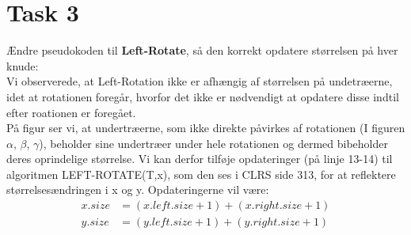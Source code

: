 \section{Task 3}

Ændre pseudokoden til \textbf{Left-Rotate}, så den korrekt opdatere størrelsen på hver knude:\\

Vi observerede, at Left-Rotation ikke er afhængig af størrelsen på undetræerne, idet at rotationen foregår, hvorfor det ikke er nødvendigt at opdatere disse indtil efter roationen er foregået.\\
På figur  ser vi, at undertræerne, som ikke direkte påvirkes af rotationen (I figuren $\alpha$, $\beta$, $\gamma$), beholder sine undertræer under hele rotationen og dermed bibeholder deres oprindelige størrelse.
Vi kan derfor tilføje opdateringer (på linje 13-14) til algoritmen LEFT-ROTATE(T,x), som den ses i CLRS side 313, for at reflektere størrelsesændringen i x og y. Opdateringerne vil være:
\begin{align*}
  x.size &= (x.left.size + 1) + (x.right.size + 1)\\
  y.size &= (y.left.size + 1) + (y.right.size + 1)
\end{align*}
